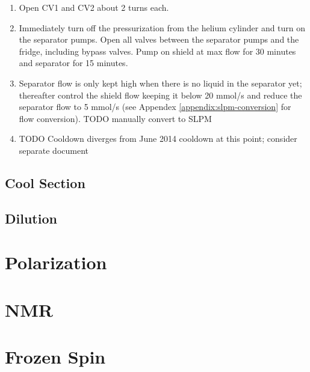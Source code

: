  \begin{enumerate}
 \item Open CV1 and CV2 about 2 turns each.
 \item Immediately turn off the pressurization from the helium cylinder and turn on the separator pumps.  Open all valves between the separator pumps and the fridge, including bypass valves.  Pump on shield at max flow for 30 minutes and separator for 15 minutes\cite{tapio-cooldown-procedure}.
 \item Separator flow is only kept high when there is no liquid in the separator yet; thereafter control the shield flow keeping it below 20 mmol/s and reduce the separator flow to 5 mmol/s (see Appendex \ref{appendix:slpm-conversion} for flow conversion).  TODO manually convert to SLPM
 \item TODO Cooldown diverges from June 2014 cooldown at this point; consider separate document
\end{enumerate}


\subsection{Cool \het{} Section}
\subsection{Dilution}

\section{Polarization}

\section{NMR}

\section{Frozen Spin}
\blindtext
